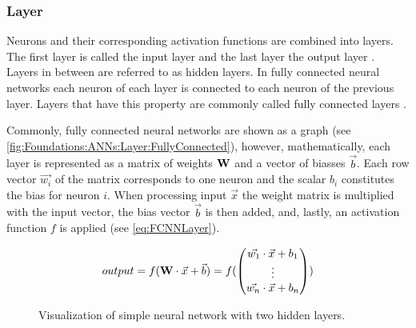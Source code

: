 

\subsubsection{Layer}
\label{sec:Foundations:NeuralNetworks:Layer}

Neurons and their corresponding activation functions are combined into layers. The first layer is called the input layer and the last layer the output layer \cite{nielsen2015neural}. Layers in between are referred to as hidden layers. In fully connected neural networks  each neuron of each layer is connected to each neuron of the previous layer. Layers that have this property are commonly called fully connected layers . 

Commonly, fully connected neural networks are shown as a graph (see \autoref{fig:Foundations:ANNs:Layer:FullyConnected}), however, mathematically, each layer is represented as a matrix of weights $\mathbf{W}$ and a vector of biasses $\vec{b}$. Each row vector $\vec{w_i}$ of the matrix corresponds to one neuron and the scalar $b_i$ constitutes the bias for neuron $i$. When processing input $\vec{x}$ the weight matrix is multiplied with the input vector, the bias vector $\vec{b}$ is then added, and, lastly, an activation function $f$ is applied (see \autoref{eq:FCNNLayer}).

\begin{equation}
    \label{eq:FCNNLayer}
    output = f(\mathbf{W} \cdot \vec{x} + \vec{b}) = f( \begin{pmatrix}
        \vec{w_1} \cdot \vec{x} + b_1\\
        \vdots \\
        \vec{w_n} \cdot \vec{x} + b_n
      \end{pmatrix} )
\end{equation}

\begin{figure}
    \centering
    \caption{Visualization of simple neural network with two hidden layers.}
    \label{fig:Foundations:ANNs:Layer:FullyConnected}
\end{figure}

